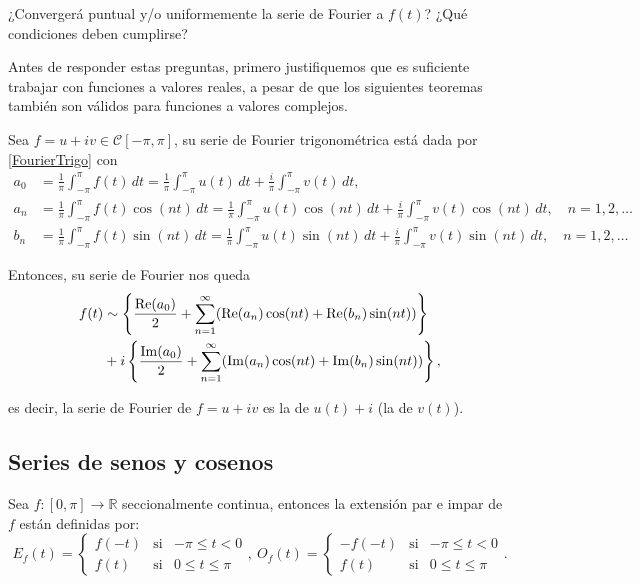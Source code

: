 ¿Convergerá puntual y/o uniformemente la serie de Fourier a $f(t)$? ¿Qué condiciones deben cumplirse?

Antes de responder estas preguntas, primero justifiquemos que es suficiente trabajar con funciones a valores reales, a pesar de que los siguientes teoremas también son válidos para funciones a valores complejos. 

Sea $f = u + iv \in \mathcal{C}[-\pi,\pi]$, su serie de Fourier trigonométrica está dada por \eqref{FourierTrigo} con 
\begin{align*}
    a_0 &= \frac{1}{\pi} \int_{-\pi}^{\pi} f(t) \,dt =  \frac{1}{\pi} \int_{-\pi}^{\pi} u(t) \,dt + \frac{i}{\pi} \int_{-\pi}^{\pi} v(t) \,dt,\\
    a_n &= \frac{1}{\pi} \int_{-\pi}^{\pi} f(t) \cos(nt) \,dt = \frac{1}{\pi} \int_{-\pi}^{\pi} u(t) \cos(nt) \,dt + \frac{i}{\pi} \int_{-\pi}^{\pi} v(t) \cos(nt) \,dt , \quad n = 1,2, \dots\\
    b_n &= \frac{1}{\pi} \int_{-\pi}^{\pi} f(t) \sin(nt) \,dt = \frac{1}{\pi} \int_{-\pi}^{\pi} u(t) \sin(nt) \,dt + \frac{i}{\pi} \int_{-\pi}^{\pi} v(t) \sin(nt) \,dt, \quad n = 1,2, \dots
\end{align*}

Entonces, su serie de Fourier nos queda
\begin{align*}
  f(t) & \sim   \left\{ \frac{\operatorname{Re}(a_0)}{2} + \sum_{n=1}^{\infty} ( \operatorname{Re}(a_n) \cos(nt) + \operatorname{Re}(b_n) \sin(nt) ) \right\}  \\
   &  + i \left\{ \frac{\operatorname{Im}(a_0)}{2} + \sum_{n=1}^{\infty} (\operatorname{Im}(a_n) \cos(nt) + \operatorname{Im}(b_n) \sin(nt)) \right\},
\end{align*}

es decir, la serie de Fourier de $f = u + iv$ es la de $u(t) + i$ (la de $v(t)$). 

\subsection{Series de senos y cosenos}

Sea $f:[0,\pi] \longrightarrow \mathbb{R}$ seccionalmente continua, entonces la extensión par e impar de $f$ están definidas por:
\begin{equation*}
    E_f(t) = \left\{ \begin{array}{cll}
    f(-t)     & \mbox{si} & -\pi \leq t < 0 \\
    f(t)     & \mbox{si} & 0 \leq t \leq \pi
    \end{array} \right. , ~ O_f(t) = \left\{ \begin{array}{cll}
    -f(-t)     & \mbox{si} & -\pi \leq t < 0 \\
    f(t)     & \mbox{si} & 0 \leq t \leq \pi
    \end{array} \right. .
\end{equation*}

